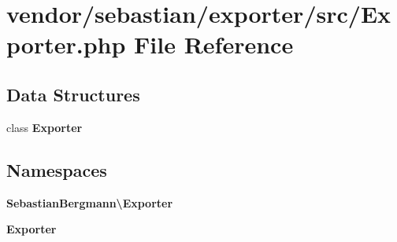 \section{vendor/sebastian/exporter/src/\+Exporter.php File Reference}
\label{_exporter_8php}
\subsection*{Data Structures}
\begin{DoxyCompactItemize}
\item 
class {\bf Exporter}
\end{DoxyCompactItemize}
\subsection*{Namespaces}
\begin{DoxyCompactItemize}
\item 
 {\bf Sebastian\+Bergmann\textbackslash{}\+Exporter}
\item 
 {\bf Exporter}
\end{DoxyCompactItemize}
